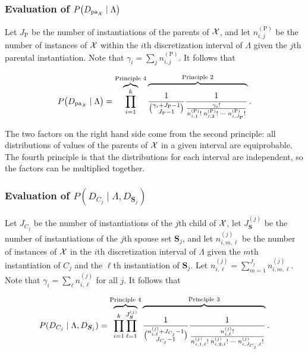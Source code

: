 \subsubsection{Evaluation of $P\paren{D_{\Pa_{\cX}} \mid \Lambda}$}

Let $J_\text{P}$ be the number of instantiations of the parents of $\mathcal{X}$, and let $n^{(\text{P})}_{i,j}$ be the number of instances of $\mathcal{X}$ within the $i$th discretization interval of $\Lambda$ given the $j$th parental instantiation.
Note that $\gamma_i = \sum_j n^{(\text{P})}_{i,j}$.
It follows that

\begin{equation}
  \label{eq:likelihood_one}
  P\paren{D_{\Pa_{\cX}} \mid \Lambda} = \overbrace{\prod_{i=1}^k}^{\text{Principle 4}}
    \overbrace{\rule{0pt}{2em}
      \frac{1}{{{\gamma_i + J_\text{P} - 1}\choose{J_\text{P} - 1}}}
      \frac{1}{
        \frac{
          {\gamma_i}!
        }{
          {n^{(\text{P})}_{i,1}}! \; {n^{(\text{P})}_{i,2}}! \; \cdots \; {n^{(\text{P})}_{i,J_\text{P}}}!
        }
      }
    }^{\text{Principle 2}}\text{.}
\end{equation}

The two factors on the right hand side come from the second principle: all distributions of values of the parents of $\mathcal{X}$ in a given interval are equiprobable.
The fourth principle is that the distributions for each interval are independent, so the factors can be multiplied together.

\subsubsection{Evaluation of $P(D_{C_j} \mid \Lambda, D_{\bm{S}_j})$}
Let $J_{C_j}$ be the number of instantiations of the $j$th child of $\mathcal{X}$, let $J_{\bm{S}}^{(j)}$ be the number of instantiations of the $j$th spouse set $\bm{S}_j$, and let $n^{(j)}_{i,m,\ell}$ be the number of instances of $\mathcal{X}$ in the $i$th discretization interval of $\Lambda$ given the $m$th instantiation of $C_j$ and the $\ell$th instantiation of $\bm{S}_j$.
Let ${n^{(j)}_{i,\ell} = \sum_{m=1}^{J_j} n^{(j)}_{i,m,\ell}}$.
Note that ${\gamma_i = \sum_{\ell} n^{(j)}_{i,\ell}}$ for all $j$.
It follows that

\begin{equation}
  \label{eq:likelihood_two}
  P(D_{C_j} \mid \Lambda, D_{\bm{S}_j}) =
  \overbrace{\prod_{i=1}^{k} \prod_{\ell=1}^{J_{\bm{S}}^{(j)}}}^{\text{Principle 4}}
    \overbrace{\rule{0pt}{2.3em}
      {
        \frac{1}{
          {{n^{(j)}_{i,\ell} + J_{C_j} - 1}\choose{J_{C_j}-1}}}
        }
        {\frac{
          1
        }{
          \frac{
            {n^{(j)}_{i,\ell}}!
          }{
            {n^{(j)}_{i,1,\ell}!} \; {n^{(j)}_{i,2,\ell}!} \; \cdots \; {n^{(j)}_{i,J_{C_j},\ell}!}
          }
        }
      }
    }^{\text{Principle 3}}
    \text{.}
\end{equation}

